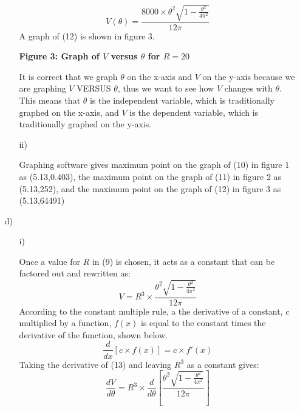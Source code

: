 \documentclass{article}
\begin{document}
\begin{itemize}
\begin{itemize}
\begin{equation}
            V(\theta)=\frac{8000\times\theta^2\sqrt{1-\frac{\theta^2}{4\pi^2}}}{12\pi}
        \end{equation}
        A graph of (12) is shown in figure 3.
        \newline
        
        \begin{center}
            \newline
            \textbf{Figure 3: Graph of \(V\) versus \(\theta\) for \(R=20\)}
        \end{center}
        
        It is correct that we graph \(\theta\) on the x-axis and \(V\) on the y-axis because we are graphing \(V\) VERSUS \(\theta\), thus we want to see how \(V\) changes with \(\theta\). This means that \(\theta\) is the independent variable, which is traditionally graphed on the x-axis, and \(V\) is the dependent variable, which is traditionally graphed on the y-axis.
        
        \item[ii)]
        
        Graphing software gives maximum point on the graph of (10) in figure 1 as (5.13,0.403), the maximum point on the graph of (11) in figure 2 as (5.13,252), and the maximum point on the graph of (12) in figure 3 as (5.13,64491)


        
    \end{itemize}
    \item[d)]
    \begin{itemize}
        \item[i)]
        
        Once a value for \(R\) in (9) is chosen, it acts as a constant that can be factored out and rewritten as:
        \begin{equation}
            V=R^3\times\frac{\theta^2\sqrt{1-\frac{\theta^2}{4\pi^2}}}{12\pi}
        \end{equation}
        According to the constant multiple rule, a the derivative of a constant, \(c\) multiplied by a function, \(f(x)\) is equal to the constant times the derivative of the function, shown below. \[\frac{d}{dx}\left[c\times f(x)\right]=c\times f'(x)\]
        Taking the derivative of (13) and leaving \(R^3\) as a constant gives:
        \begin{equation}
            \frac{dV}{d\theta}=R^3\times\frac{d}{d\theta}\left[\frac{\theta^2\sqrt{1-\frac{\theta^2}{4\pi^2}}}{12\pi}\right]
        \end{equation}
        

\end{itemize}
\end{itemize}
\end{document}
